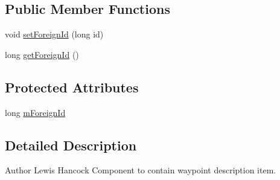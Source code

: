 \subsection*{Public Member Functions}
\begin{DoxyCompactItemize}
\item 
void \hyperlink{classuk_1_1ac_1_1swan_1_1digitaltrails_1_1components_1_1_waypoint_description_a948f17dcaac7371e474ca957856f674a}{set\+Foreign\+Id} (long id)
\item 
long \hyperlink{classuk_1_1ac_1_1swan_1_1digitaltrails_1_1components_1_1_waypoint_description_aea823f8897693efc497955b489998095}{get\+Foreign\+Id} ()
\end{DoxyCompactItemize}
\subsection*{Protected Attributes}
\begin{DoxyCompactItemize}
\item 
long \hyperlink{classuk_1_1ac_1_1swan_1_1digitaltrails_1_1components_1_1_waypoint_description_a1df2c3231c28135521513cb4495af840}{m\+Foreign\+Id}
\end{DoxyCompactItemize}


\subsection{Detailed Description}
\begin{DoxyAuthor}{Author}
Lewis Hancock Component to contain waypoint description item. 
\end{DoxyAuthor}


